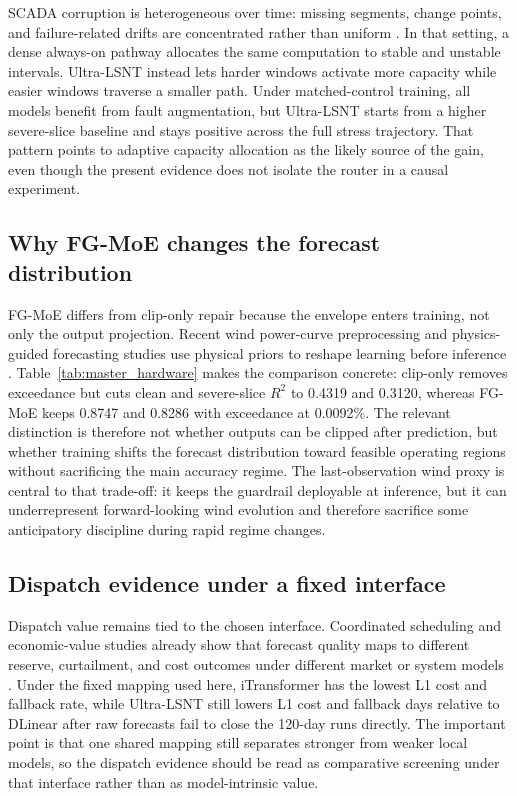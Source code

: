 ﻿\documentclass[review,1p,times]{elsarticle}
\begin{document}
SCADA corruption is heterogeneous over time: missing segments, change points, and failure-related drifts are concentrated rather than uniform \citep{tautzweinert2017review,leahy2019dataquality,letzgus2020,vervlimmeren2025scalable}. In that setting, a dense always-on pathway allocates the same computation to stable and unstable intervals. Ultra-LSNT instead lets harder windows activate more capacity while easier windows traverse a smaller path. Under matched-control training, all models benefit from fault augmentation, but Ultra-LSNT starts from a higher severe-slice baseline and stays positive across the full stress trajectory. That pattern points to adaptive capacity allocation as the likely source of the gain, even though the present evidence does not isolate the router in a causal experiment.

\subsection{Why FG-MoE changes the forecast distribution}

FG-MoE differs from clip-only repair because the envelope enters training, not only the output projection. Recent wind power-curve preprocessing and physics-guided forecasting studies use physical priors to reshape learning before inference \citep{martincalzada2025optimized,liu2024physics,parsa2025physics}. Table~\ref{tab:master_hardware} makes the comparison concrete: clip-only removes exceedance but cuts clean and severe-slice $R^2$ to 0.4319 and 0.3120, whereas FG-MoE keeps 0.8747 and 0.8286 with exceedance at 0.0092\%. The relevant distinction is therefore not whether outputs can be clipped after prediction, but whether training shifts the forecast distribution toward feasible operating regions without sacrificing the main accuracy regime. The last-observation wind proxy is central to that trade-off: it keeps the guardrail deployable at inference, but it can underrepresent forward-looking wind evolution and therefore sacrifice some anticipatory discipline during rapid regime changes.

\subsection{Dispatch evidence under a fixed interface}
\label{subsec:disc_dispatch_network}
\label{subsec:disc_dispatch}

Dispatch value remains tied to the chosen interface. Coordinated scheduling and economic-value studies already show that forecast quality maps to different reserve, curtailment, and cost outcomes under different market or system models \citep{khaloie2020coordinated,yan2025economicvalue,li2024opf_highren}. Under the fixed mapping used here, iTransformer has the lowest L1 cost and fallback rate, while Ultra-LSNT still lowers L1 cost and fallback days relative to DLinear after raw forecasts fail to close the 120-day runs directly. The important point is that one shared mapping still separates stronger from weaker local models, so the dispatch evidence should be read as comparative screening under that interface rather than as model-intrinsic value.
\end{document}
